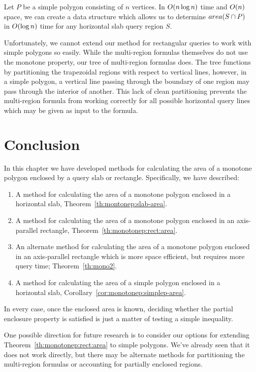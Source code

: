 \begin{corollary}
\label{cor:monotonep:simplep-area}
Let $P$ be a simple polygon consisting of $n$ vertices.
In $O\!\left(n \log{n}\right)$ time and $O\!\left(n\right)$ space, we can create a data structure which allows us to determine $area(S \cap P)$ in $O\!\left(\log{n}\right)$ time for any horizontal slab query region $S$.
\end{corollary}

Unfortunately, we cannot extend our method for rectangular queries to work with simple polygons so easily.
While the multi-region formulas themselves do not use the monotone property, our tree of multi-region formulas does. 
The tree functions by partitioning the trapezoidal regions with respect to vertical lines, however, in a simple polygon, a vertical line passing through the boundary of one region may pass through the interior of another. 
This lack of clean partitioning prevents the multi-region formula from working correctly for all possible horizontal query lines which may be given as input to the formula.

\section{Conclusion}
\label{:monotonep:concl}

In this chapter we have developed methods for calculating the area of a monotone polygon enclosed by a query slab or rectangle.  Specifically, we have described:

\begin{enumerate}
\item A method for calculating the area of a monotone polygon enclosed in a horizontal slab, Theorem~\ref{th:montonep:slab-area}.

\item A method for calculating the area of a monotone polygon enclosed in an axis-parallel rectangle, Theorem~\ref{th:monotonep:rect:area}.

\item An alternate method for calculating the area of a monotone polygon enclosed in an axis-parallel rectangle which is more space efficient, but requires more query time; Theorem~\ref{th:mono2}.

\item A method for calculating the area of a simple polygon enclosed in a horizontal slab, Corollary~\ref{cor:monotonep:simplep-area}.

\end{enumerate}

In every case, once the enclosed area is known, deciding whether the partial enclosure property is satisfied is just a matter of testing a simple inequality.

One possible direction for future research is to consider our options for extending Theorem~\ref{th:monotonep:rect:area} to simple polygons. 
We've already seen that it does not work directly, but there may be alternate methods for partitioning the multi-region formulas or accounting for partially enclosed regions.
